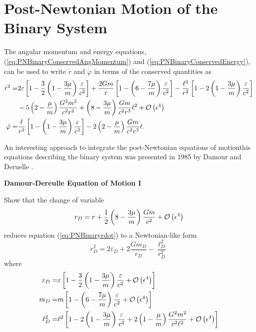 \section{Post-Newtonian Motion of the Binary System}

The angular momentum and energy equations, (\ref{eq:PNBinaryConservedAngMomentum}) and (\ref{eq:PNBinaryConservedEnergy}), can be used to write $\dot{r}$ and $\dot{\varphi}$ in terms of the conserved quantities as
\begin{subequations}
\begin{align}
\dot{r}^2 = & 2\varepsilon \left[ 1 - \frac{3}{2} \left( 1 - \frac{3\mu}{m} \right) \frac{\varepsilon}{c^2} \right] + \frac{2Gm}{r} \left[ 1 - \left( 6 - \frac{7\mu}{m} \right) \frac{\varepsilon}{c^2} \right] - \frac{\ell^2}{r^2}\left[ 1 - 2 \left( 1 - \frac{3\mu}{m} \right) \frac{\varepsilon}{c^2} \right] \notag \\
& - 5 \left( 2 - \frac{\mu}{m} \right) \frac{G^2 m^2}{c^2 r^2} + \left( 8 - \frac{3\mu}{m} \right) \frac{Gm}{c^2r^3} \ell^2 + {\mathcal{O}} \left( \epsilon^4 \right) \label{eq:PNBinaryrdot} \\
\dot{\varphi} = &\frac{\ell}{r^2} \left[ 1 - \left( 1 - \frac{3\mu}{m} \right) \frac{\varepsilon}{c^2} \right] - 2 \left( 2 - \frac{\mu}{m} \right) \frac{Gm}{c^2 r^3} \ell .
\end{align}
\end{subequations}

An interesting approach to integrate the post-Newtonian equations of motionthis equations describing the binary system was presented in 1985 by Damour and Deruelle \cite{Damour1985}. 

\begin{exercise}
\textbf{Damour-Dereulle Equation of Motion I}

Show that the change of variable 
\begin{equation}
r_D = r + \frac{1}{2} \left( 8-\frac{3\mu}{m} \right) \frac{Gm}{c^2} + {\mathcal{O}} \left( \epsilon^4 \right)
\end{equation}
reduces equation (\ref{eq:PNBinaryrdot}) to a Newtonian-like form
\begin{equation}
\dot{r}_D^2 = 2\varepsilon_D + 2 \frac{Gm_D}{r_D} - \frac{\ell_D^2}{r_D^2} \label{eq:PNBinaryDamourEoM}
\end{equation}
where
\begin{subequations}
\begin{align}
\varepsilon_D = &\varepsilon \left[ 1 - \frac{3}{2} \left( 1 - \frac{3\mu}{m} \right) \frac{\varepsilon}{c^2} + {\mathcal{O}} \left( \epsilon^4 \right) \right] \\
m_D = &m \left[ 1 - \left( 6 - \frac{7\mu}{m} \right) \frac{\varepsilon}{c^2} + {\mathcal{O}} \left( \epsilon^4 \right) \right] \\
\ell_D^2 = & \ell^2 \left[ 1 - 2 \left( 1 - \frac{3\mu}{m} \right) \frac{\varepsilon}{c^2} + 2 \left( 1 - \frac{\mu}{m} \right) \frac{G^2 m^2}{c^2 \ell^2}  + {\mathcal{O}} \left( \epsilon^4 \right) \right] 
\end{align}
\end{subequations}
\end{exercise}

